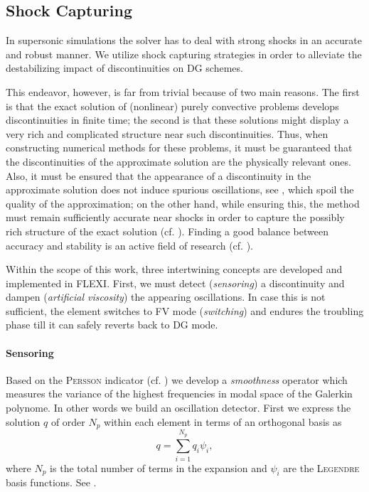 \subsection{Shock Capturing}
\label{sec:shock-capturing}

In supersonic simulations the solver has to deal with strong shocks in an
accurate and robust manner. We utilize shock capturing strategies in order to
alleviate the destabilizing impact of discontinuities on DG schemes.

This endeavor, however, is far from trivial because of two main reasons.  The
first is that the exact solution of (nonlinear) purely convective problems
develops discontinuities in finite time; the second is that these solutions
might display a very rich and complicated structure near such discontinuities.
Thus, when constructing numerical methods for these problems, it must be
guaranteed that the discontinuities of the approximate solution are the
physically relevant ones. Also, it must be ensured that the appearance of a
discontinuity in the approximate solution does not induce spurious
oscillations, see , which spoil the quality of
the approximation; on the other hand, while ensuring this, the method must
remain sufficiently accurate near shocks in order to capture the possibly rich
structure of the exact solution (cf.  ). Finding a good
balance between accuracy and stability is an active field of research (cf.
\cite{atkins2011robust,lo2010high,kurganov2012new}).

Within the scope of this work, three intertwining concepts are developed and
implemented in FLEXI. First, we must detect (\emph{sensoring}) a discontinuity
and dampen (\emph{artificial viscosity}) the appearing oscillations. In case
this is not sufficient, the element switches to FV mode (\emph{switching}) and
endures the troubling phase till it can safely reverts back to DG mode.

\paragraph{Sensoring}
Based on the \textsc{Persson} indicator (cf. \cite{persson_peraire_2006}) we
develop a \emph{smoothness} operator which measures the variance of the
highest frequencies in modal space of the Galerkin polynome. In other words we
build an oscillation detector.  First we express the solution $q$ of order
$N_p$ within each element in terms of an orthogonal basis as
\begin{equation}
    q = \sum^{N_p}_{i=1} q_i \psi_i,
\end{equation}
where $N_p$ is the total number of terms in the expansion and $\psi_i$ are the
\textsc{Legendre} basis functions. See .


